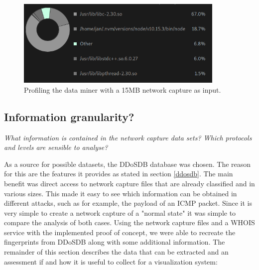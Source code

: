     \begin{figure}[]
    \centering
    \includegraphics[width=10cm]{images/profiling.png}
    \caption{Profiling the data miner with a 15MB network capture as input.}
    \label{fig:profiling}
\end{figure}


\subsection{Information granularity?}
\textit{What information is contained in the network capture data sets? Which protocols and levels are sensible to analyse?
}

As a source for possible datasets, the DDoSDB database was chosen. The reason for this are the features it provides as stated in section \ref{ddosdb}. The main benefit was direct access to network capture files that are already classified and in various sizes. This made it easy to see which information can be obtained in different attacks, such as for example, the payload of an ICMP packet. Since it is very simple to create a network capture of a "normal state" it was simple to compare the analysis of both cases.
Using the network capture files and a WHOIS service with the implemented proof of concept, we were able to recreate the fingerprints from DDoSDB along with some additional information. The remainder of this section describes the data that can be extracted and an assessment if and how it is useful to collect for a visualization system:

